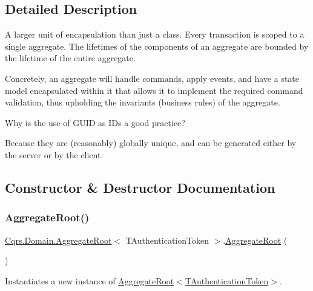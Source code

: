 \subsection{Detailed Description}
A larger unit of encapsulation than just a class. Every transaction is scoped to a single aggregate. The lifetimes of the components of an aggregate are bounded by the lifetime of the entire aggregate. 

Concretely, an aggregate will handle commands, apply events, and have a state model encapsulated within it that allows it to implement the required command validation, thus upholding the invariants (business rules) of the aggregate. 

Why is the use of G\+U\+ID as I\+Ds a good practice?

Because they are (reasonably) globally unique, and can be generated either by the server or by the client. 

\subsection{Constructor \& Destructor Documentation}
\mbox{\label{classCqrs_1_1Domain_1_1AggregateRoot_a1db2322dd7442e1e0c3c07332124eb2f_a1db2322dd7442e1e0c3c07332124eb2f}} 
\subsubsection{\texorpdfstring{Aggregate\+Root()}{AggregateRoot()}}
{\footnotesize\ttfamily \hyperlink{classCqrs_1_1Domain_1_1AggregateRoot}{Cqrs.\+Domain.\+Aggregate\+Root}$<$ T\+Authentication\+Token $>$.\hyperlink{classCqrs_1_1Domain_1_1AggregateRoot}{Aggregate\+Root} (\begin{DoxyParamCaption}{ }\end{DoxyParamCaption})\hspace{0.3cm}{\ttfamily [protected]}}



Instantiates a new instance of \hyperlink{classCqrs_1_1Domain_1_1AggregateRoot_a1db2322dd7442e1e0c3c07332124eb2f_a1db2322dd7442e1e0c3c07332124eb2f}{Aggregate\+Root$<$\+T\+Authentication\+Token$>$}. 



